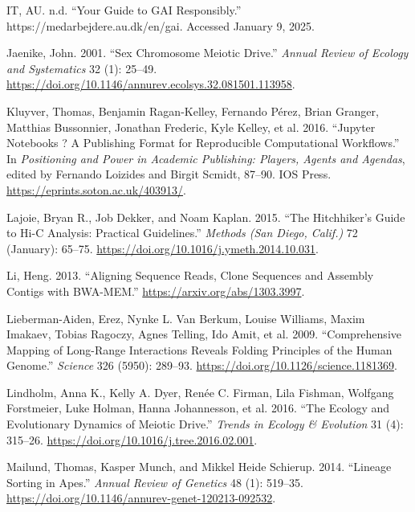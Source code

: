 \documentclass[
  11pt,
  a4paper,
]{scrbook}
\newlength{\cslhangindent}
\newenvironment{CSLReferences}[2] %
 {\begin{list}{}{%
  \setlength{\itemindent}{0pt}
  \setlength{\leftmargin}{0pt}
  \setlength{\parsep}{0pt}
  \ifodd #1
   \setlength{\leftmargin}{\cslhangindent}
   \setlength{\itemindent}{-1\cslhangindent}
  \fi
  \setlength{\itemsep}{#2\baselineskip}}}
 {\end{list}}
\begin{document}
\begin{CSLReferences}{1}{0}
IT, AU. n.d. {``Your Guide to {GAI} Responsibly.''}
https://medarbejdere.au.dk/en/gai. Accessed January 9, 2025.

Jaenike, John. 2001. {``Sex {Chromosome Meiotic Drive}.''} \emph{Annual
Review of Ecology and Systematics} 32 (1): 25--49.
\url{https://doi.org/10.1146/annurev.ecolsys.32.081501.113958}.

Kluyver, Thomas, Benjamin Ragan-Kelley, Fernando Pérez, Brian Granger,
Matthias Bussonnier, Jonathan Frederic, Kyle Kelley, et al. 2016.
{``Jupyter Notebooks ? A Publishing Format for Reproducible
Computational Workflows.''} In \emph{Positioning and Power in Academic
Publishing: Players, Agents and Agendas}, edited by Fernando Loizides
and Birgit Scmidt, 87--90. IOS Press.
\url{https://eprints.soton.ac.uk/403913/}.

Lajoie, Bryan R., Job Dekker, and Noam Kaplan. 2015. {``The
{Hitchhiker}'s {Guide} to {Hi-C Analysis}: {Practical} Guidelines.''}
\emph{Methods (San Diego, Calif.)} 72 (January): 65--75.
\url{https://doi.org/10.1016/j.ymeth.2014.10.031}.

Li, Heng. 2013. {``Aligning Sequence Reads, Clone Sequences and Assembly
Contigs with BWA-MEM.''} \url{https://arxiv.org/abs/1303.3997}.

Lieberman-Aiden, Erez, Nynke L. Van Berkum, Louise Williams, Maxim
Imakaev, Tobias Ragoczy, Agnes Telling, Ido Amit, et al. 2009.
{``Comprehensive {Mapping} of {Long-Range Interactions Reveals Folding
Principles} of the {Human Genome}.''} \emph{Science} 326 (5950):
289--93. \url{https://doi.org/10.1126/science.1181369}.

Lindholm, Anna K., Kelly A. Dyer, Renée C. Firman, Lila Fishman,
Wolfgang Forstmeier, Luke Holman, Hanna Johannesson, et al. 2016. {``The
{Ecology} and {Evolutionary Dynamics} of {Meiotic Drive}.''}
\emph{Trends in Ecology \& Evolution} 31 (4): 315--26.
\url{https://doi.org/10.1016/j.tree.2016.02.001}.

Mailund, Thomas, Kasper Munch, and Mikkel Heide Schierup. 2014.
{``Lineage {Sorting} in {Apes}.''} \emph{Annual Review of Genetics} 48
(1): 519--35. \url{https://doi.org/10.1146/annurev-genet-120213-092532}.


\end{CSLReferences}
\end{document}
